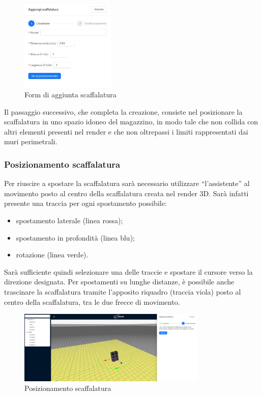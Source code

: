             \begin{figure}[H]
                \centering
                \includegraphics[width=0.4\textwidth]{images/creazione_scaffalatura.png}
                \caption{Form di aggiunta scaffalatura}
            \end{figure}

            \noindent Il passaggio successivo, che completa la creazione, consiste nel posizionare la scaffalatura in uno spazio idoneo del magazzino, in modo tale che non collida con altri elementi presenti nel render e che non oltrepassi i limiti rappresentati dai muri perimetrali.
            
            \subsubsection{Posizionamento scaffalatura}\label{sec:scaffalature:posizionamento}
            Per riuscire a spostare la scaffalatura sarà necessario utilizzare ``l'assistente'' al movimento posto al centro della scaffalatura creata nel render 3D. 
            Sarà infatti presente una traccia per ogni spostamento possibile: 
            \begin{itemize}
                \item spostamento laterale (linea rossa); 
                \item spostamento in profondità (linea blu);
                \item rotazione (linea verde).
            \end{itemize}
            Sarà sufficiente quindi selezionare una delle traccie e spostare il cursore verso la direzione designata. Per spostamenti su lunghe distanze, è possibile anche trascinare la scaffalatura tramite l'apposito riquadro (traccia viola) posto al centro della scaffalatura, tra le due frecce di movimento.\\
            \begin{figure}[h!]
                \centering
                \includegraphics[width=0.8\textwidth]{images/posizionamento.png}
                \caption{Posizionamento scaffalatura}
            \end{figure}

